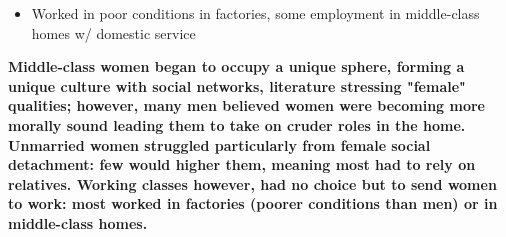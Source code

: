 \documentclass[a4paper]{article}
\begin{document}
{\begin{itemize}
        \begin{itemize}
            \item Worked in poor conditions in factories, some employment in middle-class homes w/ domestic service
        \end{itemize}
    \end{itemize}
    \textbf{Middle-class women began to occupy a unique sphere, forming a unique culture with social networks, literature stressing "female" qualities; however, many men believed women were becoming more morally sound leading them to take on cruder roles in the home. Unmarried women struggled particularly from female social detachment: few would higher them, meaning most had to rely on relatives. Working classes however, had no choice but to send women to work: most worked in factories (poorer conditions than men) or in middle-class homes.}}
\end{document}

